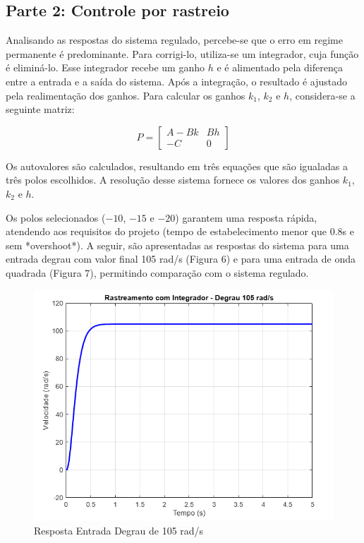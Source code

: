 \documentclass[a4paper, 12pt]{article}
\begin{document}
\begin{itemize}
\subsection{Parte 2: Controle por rastreio}
    Analisando as respostas do sistema regulado, percebe-se que o erro em regime permanente é predominante. Para corrigi-lo, utiliza-se um integrador, cuja função é eliminá-lo. Esse integrador recebe um ganho \( h \) e é alimentado pela diferença entre a entrada e a saída do sistema. Após a integração, o resultado é ajustado pela realimentação dos ganhos. Para calcular os ganhos \( k_1 \), \( k_2 \) e \( h \), considera-se a seguinte matriz:
    
    \[
    P = \begin{bmatrix}
    A - B k & B h \\
    -C & 0
    \end{bmatrix}
    \]

    Os autovalores são calculados, resultando em três equações que são igualadas a três polos escolhidos. A resolução desse sistema fornece os valores dos ganhos \( k_1 \), \( k_2 \) e \( h \). 
    
    Os polos selecionados (\(-10\), \(-15\) e \(-20\)) garantem uma resposta rápida, atendendo aos requisitos do projeto (tempo de estabelecimento menor que 0.8s e sem *overshoot*). A seguir, são apresentadas as respostas do sistema para uma entrada degrau com valor final 105 rad/s (Figura 6) e para uma entrada de onda quadrada (Figura 7), permitindo comparação com o sistema regulado.
    

\begin{figure}[H]
    \centering
    \includegraphics[width=0.75\linewidth]{stepRastreio.png}
    \caption{Resposta Entrada Degrau de 105 rad/s}
    \label{fig:enter-label}
\end{figure}


\end{itemize}
\end{document}
